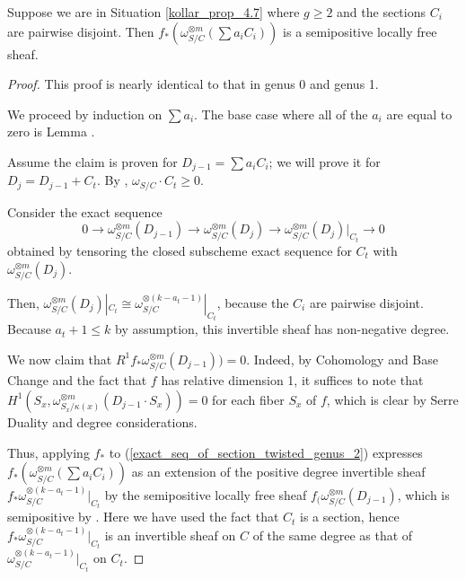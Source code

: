 


\begin{lemma}\label{inductive_step_genus_2}
Suppose we are in Situation \ref{kollar_prop_4.7} where $g\ge2$ and the sections $C_i$ are pairwise disjoint.
Then $f_{*}(\omega_{S/C}^{\otimes m}(\sum a_iC_i))$ is a semipositive locally free sheaf.
\end{lemma}
\begin{proof}
This proof is nearly identical to that in genus 0 and genus 1.

We proceed by induction on $\sum a_i$.
The base case where all of the $a_i$ are equal to zero is Lemma .

Assume the claim is proven for $D_{j-1}=\sum a_iC_i$; we will prove it for $D_{j}=D_{j-1}+C_t$.
By , $\omega_{S/C}\cdot C_t\ge0$.

Consider the exact sequence
\begin{equation*}\label{exact_seq_of_section_twisted_genus_2}
0\to\omega_{S/C}^{\otimes m}(D_{j-1})\to\omega_{S/C}^{\otimes m}(D_j)\to \omega_{S/C}^{\otimes m}(D_j)|_{C_t}\to0
\end{equation*}
obtained by tensoring the closed subscheme exact sequence for $C_t$ with $\omega_{S/C}^{\otimes m}(D_j)$.

Then, $\omega_{S/C}^{\otimes m}(D_j)|_{C_t}\cong \omega_{S/C}^{\otimes (k-a_{t}-1)}|_{C_t}$, because the $C_i$ are pairwise disjoint.
Because $a_{t}+1\le k$ by assumption, this invertible sheaf has non-negative degree.

We now claim that $R^{1}f_{*}\omega_{S/C}^{\otimes m}(D_{j-1}))=0$.
Indeed, by Cohomology and Base Change and the fact that $f$ has relative dimension 1, it suffices to note that $H^{1}(S_x,\omega_{S_x/\kappa(x)}^{\otimes m}(D_{j-1}\cdot S_x))=0$ for each fiber $S_x$ of $f$, which is clear by Serre Duality and degree considerations.

Thus, applying $f_{*}$ to (\ref{exact_seq_of_section_twisted_genus_2}) expresses $f_{*}(\omega_{S/C}^{\otimes m}(\sum a_iC_i))$ as an extension of the positive degree invertible sheaf $f_{*}\omega_{S/C}^{\otimes (k-a_{t}-1)}|_{C_t}$ by the semipositive locally free sheaf $f_{(}\omega_{S/C}^{\otimes m}(D_{j-1})$, which is semipositive by .
Here we have used the fact that $C_t$ is a section, hence $f_{*}\omega_{S/C}^{\otimes (k-a_{t}-1)}|_{C_t}$ is an invertible sheaf on $C$ of the same degree as that of $\omega_{S/C}^{\otimes (k-a_{t}-1)}|_{C_t}$ on $C_t$.
\end{proof}

